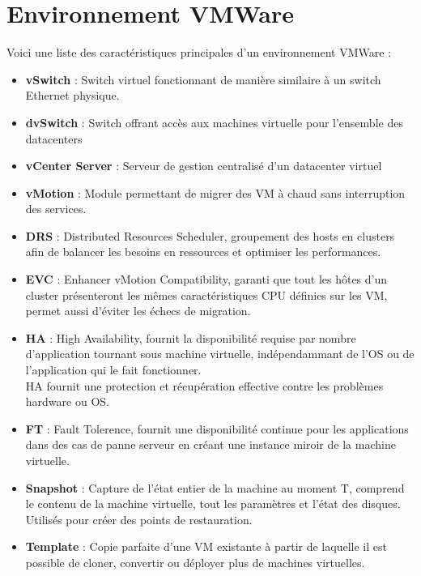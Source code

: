 \documentclass{report}
\begin{document}
	\section{Environnement VMWare}

		Voici une liste des caractéristiques principales d'un environnement VMWare : \\

		\begin{itemize}
			\item \textbf{vSwitch} : Switch virtuel fonctionnant de manière similaire à un switch Ethernet physique.
			\item \textbf{dvSwitch} : Switch offrant accès aux machines virtuelle pour l'ensemble des datacenters
			\item \textbf{vCenter Server} : Serveur de gestion centralisé d'un datacenter virtuel
			\item \textbf{vMotion} : Module permettant de migrer des VM à chaud sans interruption des services.
			\item \textbf{DRS} : Distributed Resources Scheduler, groupement des hosts en clusters afin de balancer les besoins en ressources et optimiser les performances.
			\item \textbf{EVC} : Enhancer vMotion Compatibility, garanti que tout les hôtes d'un cluster présenteront les mêmes caractéristiques CPU définies sur les VM, permet aussi d'éviter les échecs de migration.
			\item \textbf{HA} : High Availability, fournit la disponibilité requise par nombre d'application tournant sous machine virtuelle, indépendammant de l'OS ou de l'application qui le fait fonctionner.\\
			HA fournit une protection et récupération effective contre les problèmes hardware ou OS.\\
			\item \textbf{FT} : Fault Tolerence, fournit une disponibilité continue pour les applications dans des cas de panne serveur en créant une instance miroir de la machine virtuelle.
			\item \textbf{Snapshot} : Capture de l'état entier de la machine au moment T, comprend le contenu de la machine virtuelle, tout les paramètres et l'état des disques. Utilisés pour créer des points de restauration.\\
			\item \textbf{Template} : Copie parfaite d'une VM existante à partir de laquelle il est possible de cloner, convertir ou déployer plus de machines virtuelles.\\
		\end{itemize}
\end{document}
